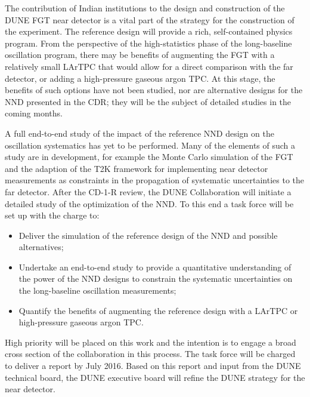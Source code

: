 The contribution of Indian institutions to the design and construction
of the DUNE FGT near detector is a vital part of the strategy for the
construction of the experiment. The reference design will provide a
rich, self-contained physics program. From the perspective of the
high-statistics phase of the long-baseline oscillation program, there
may be benefits of augmenting the FGT with a relatively small LArTPC
that would allow for a direct comparison with the far detector, or
adding a high-pressure gaseous argon TPC. At this stage, the benefits
of such options have not been studied, nor are alternative designs for
the NND presented in the CDR; they will be the subject of detailed
studies in the coming months.

A full end-to-end study of the impact of the reference NND 
design on the
oscillation systematics has yet to be performed. Many of the elements
of such a study are in development, for example the Monte Carlo
simulation of the FGT and the adaption of the T2K framework for
implementing near detector measurements as constraints in the propagation of
systematic uncertainties to the far detector.  After the CD-1-R review, the DUNE
Collaboration will initiate a detailed study of the optimization of
the NND. 
To this end a task force will be set up with the
charge to:
\begin{itemize}
\item Deliver the simulation of the reference design of the NND and
  possible alternatives;
\item Undertake an end-to-end study to provide a quantitative
  understanding of the power of the NND designs to constrain the
  systematic uncertainties on the long-baseline oscillation measurements;
\item Quantify the benefits of augmenting the reference design with
  a LArTPC or high-pressure gaseous argon TPC.
\end{itemize}
High priority will be placed on this work and the intention is to
engage a broad cross section of the collaboration in this process. The
task force will be charged to deliver a report by July 2016. Based on
this report and input from the DUNE technical board,
the DUNE executive board will refine the DUNE strategy for the near
detector. 
